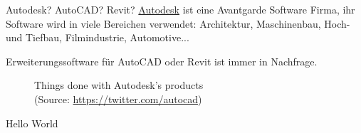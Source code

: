 \begin{frame}{Autodesk? AutoCAD? Revit?}
\href{https://en.wikipedia.org/wiki/Autodesk}{Autodesk} ist eine Avantgarde Software Firma, ihr Software wird in viele Bereichen verwendet: Architektur, Maschinenbau, Hoch- und Tiefbau, Filmindustrie, Automotive...

Erweiterungssoftware für \alert{AutoCAD} oder \alert{Revit} ist immer in Nachfrage.

\begin{figure}
    \centering
    \qquad
    \caption{Things done with Autodesk's products\\
    (Source: \href{https://twitter.com/autocad}{https://twitter.com/autocad})}%
    \label{fig:example}
\end{figure}

\end{frame}

\begin{frame}{Hello World}
    
\end{frame}
